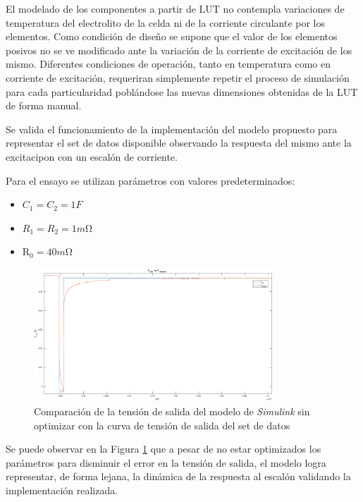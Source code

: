 \documentclass[10pt,a4paper]{article}
\begin{document}
El modelado de los componentes a partir de \acrshort{LUT} no contempla
variaciones de temperatura del electrolito de la celda ni de la corriente
circulante por los elementos. Como condición de diseño se supone que el valor de
los elementos posivos no se ve modificado ante la variación de la corriente de
excitación de los mismo. Diferentes condiciones de operación, tanto en
temperatura como en corriente de excitación, requeriran simplemente repetir el
proceso de simulación para cada particularidad poblándose las nuevas dimensiones
obtenidas de la \acrshort{LUT} de forma manual.

Se valida el funcionamiento de la implementación del modelo propuesto para
representar el set de datos disponible observando la respuesta del mismo ante la
excitacipon con un escal\'on de corriente.

\newpage

Para el ensayo se utilizan par\'ametros con valores predeterminados: 

\begin{itemize}
    \item $C_{1} = C_{2} = 1F$
    \item $ R_{1} = R_{2} = 1m\mathrm{\Omega}$
    \item $\mathrm{R_0}=40m\mathrm{\Omega}$
\end{itemize}

\begin{figure}[h!]
    \begin{center}
        \includegraphics[width=0.8\textwidth]{v_sim_v_dataset_no_opt.eps}
        \caption{Comparaci\'on de la tensi\'on de salida del modelo de
                 \emph{Simulink} sin optimizar con la curva de tensi\'on de 
                 salida del set de datos}
         \label{comp_simulink_no_opt}
    \end{center}
\end{figure}

Se puede observar en la Figura \ref{comp_simulink_no_opt} que a pesar de no
estar optimizados los parámetros para disminuir el error en la tensi\'on de
salida, el modelo logra representar, de forma lejana, la din\'amica de la
respuesta al escal\'on validando la implementación realizada.
\end{document}

